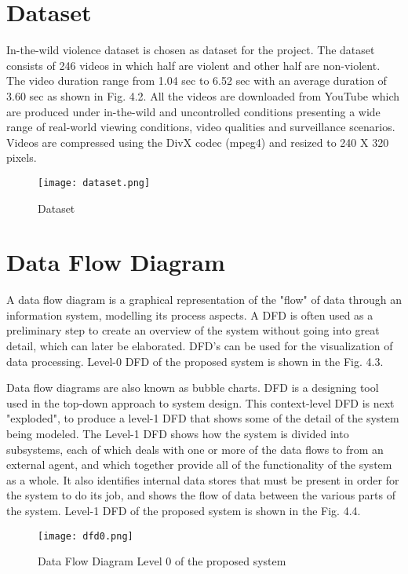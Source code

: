 \section{Dataset}
In-the-wild violence dataset is chosen as dataset for the project. The dataset consists of 246 videos in which half are violent and other half are non-violent. The video duration range from 1.04 sec to 6.52 sec with an average duration of 3.60 sec as shown in Fig. 4.2. All the videos are downloaded from YouTube which are produced under in-the-wild and uncontrolled conditions presenting a wide range of real-world viewing conditions, video qualities and surveillance scenarios. Videos are compressed using the DivX codec (mpeg4) and resized to 240 X 320 pixels.

\begin{center}
\begin{figure}[H]
\centering
\texttt{[image: dataset.png]}
\caption{Dataset}
\end{figure}
\end{center}
\section{Data Flow Diagram}
A data flow diagram is a graphical representation of the "flow" of data through an information system, modelling its process aspects. A DFD is often used as a preliminary step to create an overview of the system without going into great detail, which can later be elaborated. DFD's can be used for the visualization of data processing. Level-0 DFD of the proposed system is shown in the Fig. 4.3.
\par
Data flow diagrams are also known as bubble charts. DFD is a designing tool used in the top-down approach to system design. This context-level DFD is next "exploded", to produce a level-1 DFD that shows some of the detail of the system being modeled. The Level-1 DFD shows how the system is divided into subsystems, each of which deals with one or more of the data flows to from an external agent, and which together provide all of the functionality of the system as a whole. It also identifies internal data stores that must be present in order for the system to do its job, and shows the flow of data between the various parts of the system. Level-1 DFD of the proposed system is shown in the Fig. 4.4.

\begin{center}
\begin{figure}[H]
\centering
\texttt{[image: dfd0.png]}
\caption{Data Flow Diagram Level 0 of the proposed system}
\end{figure}
\end{center}

